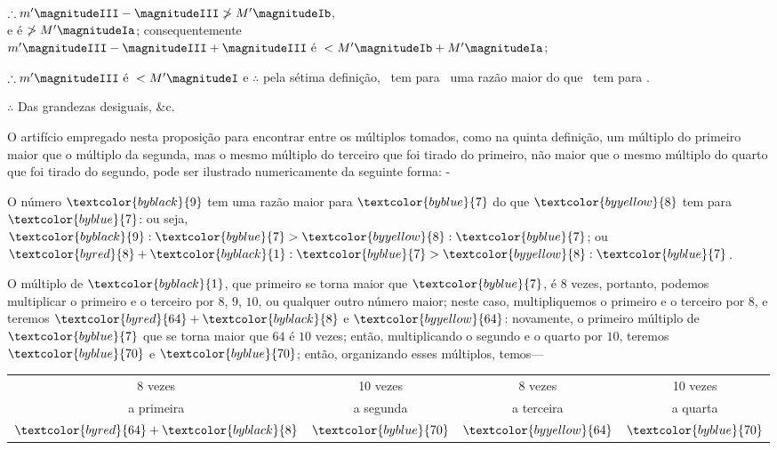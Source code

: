 \documentclass[booklanguage=brazilian]{byrnebook}
\begin{document}
\begin{center}
$\therefore m' \magnitudeIII - \magnitudeIII \ngtr M' \magnitudeIb$,\\ %
e \magnitudeIII é $\ngtr M' \magnitudeIa$; consequentemente\\ %
$m' \magnitudeIII - \magnitudeIII + \magnitudeIII \mbox{ é } < M' \magnitudeIb + M' \magnitudeIa$; %

$\therefore m' \magnitudeIII \mbox{ é } < M' \magnitudeI$ e $\therefore$ pela sétima definição, \magnitudeIII\ tem para \magnitudeII\ uma razão maior do que \magnitudeIII\ tem para \magnitudeI.

$\therefore$ Das grandezas desiguais, \&c.
\end{center}

O artifício empregado nesta proposição para encontrar entre os múltiplos tomados, como na quinta definição, um múltiplo do primeiro maior que o múltiplo da segunda, mas o mesmo múltiplo do terceiro que foi tirado do primeiro, não maior que o mesmo múltiplo do quarto que foi tirado do segundo, pode ser ilustrado numericamente da seguinte forma: -

O número $\textcolor{byblack}{9}$ tem uma razão maior para $\textcolor{byblue}{7}$ do que $\textcolor{byyellow}{8}$ tem para $\textcolor{byblue}{7}$: ou seja, $\textcolor{byblack}{9} : \textcolor{byblue}{7} > \textcolor{byyellow}{8} : \textcolor{byblue}{7}$; ou $\textcolor{byred}{8} + \textcolor{byblack}{1} : \textcolor{byblue}{7} > \textcolor{byyellow}{8} : \textcolor{byblue}{7}$.

O múltiplo de $\textcolor{byblack}{1}$, que primeiro se torna maior que $\textcolor{byblue}{7}$, é $8$ vezes, portanto, podemos multiplicar o primeiro e o terceiro por $8$, $9$, $10$, ou qualquer outro número maior; neste caso, multipliquemos o primeiro e o terceiro por $8$, e teremos $\textcolor{byred}{64} + \textcolor{byblack}{8}$ e $\textcolor{byyellow}{64}$: novamente, o primeiro múltiplo de $\textcolor{byblue}{7}$ que se torna maior que $64$ é $10$ vezes; então, multiplicando o segundo e o quarto por $10$, teremos $\textcolor{byblue}{70}$ e $\textcolor{byblue}{70}$; então, organizando esses múltiplos, temos—

\begin{center}
{\renewcommand{\arraystretch}{0.75}
\begin{tabular}{c c c c}
{\footnotesize 8 vezes} & {\footnotesize 10 vezes} & {\footnotesize 8 vezes} & {\footnotesize 10 vezes} \\
{\footnotesize a primeira} & {\footnotesize a segunda} & {\footnotesize a terceira} & {\footnotesize a quarta} \\
$\textcolor{byred}{64} + \textcolor{byblack}{8}$ & $\textcolor{byblue}{70}$ & $\textcolor{byyellow}{64}$ & $\textcolor{byblue}{70}$ \\
\end{tabular}
}
\end{center}
\end{document}
